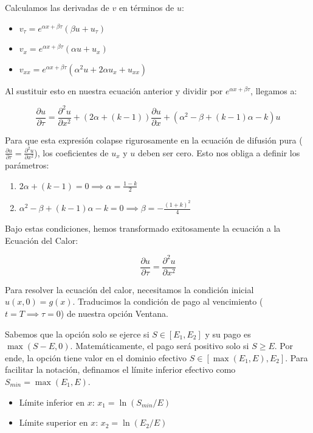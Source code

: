 \documentclass[12pt, a4paper]{article}
\begin{document}
Calculamos las derivadas de $v$ en términos de $u$:

\begin{itemize}
    \item $v_\tau = e^{\alpha x + \beta \tau} (\beta u + u_\tau)$
    \item $v_x = e^{\alpha x + \beta \tau} (\alpha u + u_x)$
    \item $v_{xx} = e^{\alpha x + \beta \tau} (\alpha^2 u + 2\alpha u_x + u_{xx})$
\end{itemize}

Al sustituir esto en nuestra ecuación anterior y dividir por $e^{\alpha x + \beta \tau}$, llegamos a:

\[ \frac{\partial u}{\partial \tau} = \frac{\partial^2 u}{\partial x^2} + (2\alpha + (k - 1)) \frac{\partial u}{\partial x} + (\alpha^2 - \beta + (k - 1)\alpha - k)u \]

Para que esta expresión colapse rigurosamente en la ecuación de difusión pura ($\frac{\partial u}{\partial \tau} = \frac{\partial^2 u}{\partial x^2}$), los coeficientes de $u_x$ y $u$ deben ser cero. Esto nos obliga a definir los parámetros:

\begin{enumerate}
    \item $2\alpha + (k - 1) = 0 \implies \alpha = \frac{1 - k}{2}$
    \item $\alpha^2 - \beta + (k - 1)\alpha - k = 0 \implies \beta = -\frac{(1 + k)^2}{4}$
\end{enumerate}

Bajo estas condiciones, hemos transformado exitosamente la ecuación a la Ecuación del Calor:

\begin{equation}
    \frac{\partial u}{\partial \tau} = \frac{\partial^2 u}{\partial x^2}
\end{equation}

Para resolver la ecuación del calor, necesitamos la condición inicial $u(x, 0) = g(x)$. Traducimos la condición de pago al vencimiento ($t=T \implies \tau=0$) de nuestra opción Ventana.

Sabemos que la opción solo se ejerce si $S \in [E_1, E_2]$ y su pago es $\max(S-E, 0)$. Matemáticamente, el pago será positivo solo si $S \ge E$. Por ende, la opción tiene valor en el dominio efectivo $S \in [\max(E_1, E), E_2]$. Para facilitar la notación, definamos el límite inferior efectivo como $S_{min} = \max(E_1, E)$.

\begin{itemize}
    \item Límite inferior en $x$: $x_1 = \ln(S_{min}/E)$
    \item Límite superior en $x$: $x_2 = \ln(E_2/E)$
\end{itemize}
\end{document}
